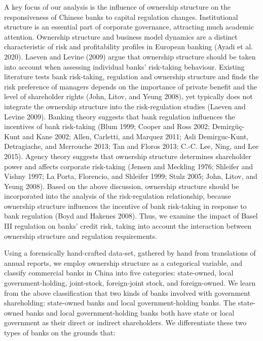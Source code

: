 \documentclass{article}
\begin{document}
A key focus of our analysis is the influence of ownership structure on
the responsiveness of Chinese banks to capital regulation changes.
Institutional structure is an essential part of corporate governance,
attracting much academic attention. Ownership structure and business
model dynamics are a distinct characteristic of risk and profitability
profiles in European banking (Ayadi et al. 2020). Laeven and Levine
(2009) argue that ownership structure should be taken into account when
assessing individual banks' risk-taking behaviour. Existing literature
tests bank risk-taking, regulation and ownership structure and finds the
risk preference of managers depends on the importance of private benefit
and the level of shareholder rights (John, Litov, and Yeung 2008), yet
typically does not integrate the ownership structure into the
risk-regulation studies (Laeven and Levine 2009). Banking theory
suggests that bank regulation influences the incentives of bank
risk-taking (Blum 1999; Cooper and Ross 2002; Demirgüç-Kunt and Kane
2002; Allen, Carletti, and Marquez 2011; Asli Demirguc-Kunt,
Detragiache, and Merrouche 2013; Tan and Floros 2013; C.-C. Lee, Ning,
and Lee 2015). Agency theory suggests that ownership structure
determines shareholder power and affects corporate risk-taking (Jensen
and Meckling 1976; Shleifer and Vishny 1997; La Porta, Florencio, and
Shleifer 1999; Stulz 2005; John, Litov, and Yeung 2008). Based on the
above discussion, ownership structure should be incorporated into the
analysis of the risk-regulation relationship, because ownership
structure influences the incentive of bank risk-taking in response to
bank regulation (Boyd and Hakenes 2008). Thus, we examine the impact of
Basel III regulation on banks' credit risk, taking into account the
interaction between ownership structure and regulation requirements.

Using a forensically hand-crafted data-set, gathered by hand from
translations of annual reports, we employ ownership structure as a
categorical variable, and classify commercial banks in China into five
categories: state-owned, local government-holding, joint-stock,
foreign-joint stock, and foreign-owned. We learn from the above
classification that two kinds of banks involved with government
shareholding: state-owned banks and local government-holding banks. The
state-owned banks and local government-holding banks both have state or
local government as their direct or indirect shareholders. We
differentiate these two types of banks on the grounds that:
\end{document}
